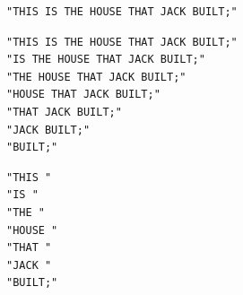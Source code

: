 \documentclass[aspectratio=1610,english]{beamer} %
\begin{document}
    \begin{lrbox}{\FileContent}
		\begin{varwidth}{\textwidth}
			\tiny
			\begin{lstlisting}[style=myCustomStyle]
"THIS IS THE HOUSE THAT JACK BUILT;"\end{lstlisting}
		\end{varwidth}
	\end{lrbox}
	
    \begin{lrbox}{\WordStrategySPTEOF}
		\begin{varwidth}{0.5\textwidth}
			\tiny
			\begin{lstlisting}[style=myCustomStyle]
"THIS IS THE HOUSE THAT JACK BUILT;"
"IS THE HOUSE THAT JACK BUILT;"
"THE HOUSE THAT JACK BUILT;"
"HOUSE THAT JACK BUILT;"
"THAT JACK BUILT;"
"JACK BUILT;"
"BUILT;"\end{lstlisting}
		\end{varwidth}
	\end{lrbox}
		
    \begin{lrbox}{\WordStrategySingle}
		\begin{varwidth}{0.5\textwidth}
			\tiny
			\begin{lstlisting}[style=myCustomStyle]
"THIS "
"IS "
"THE "
"HOUSE "
"THAT "
"JACK "
"BUILT;"\end{lstlisting}
		\end{varwidth}
	\end{lrbox}
	
  	\maketitle
  	
\end{document}
